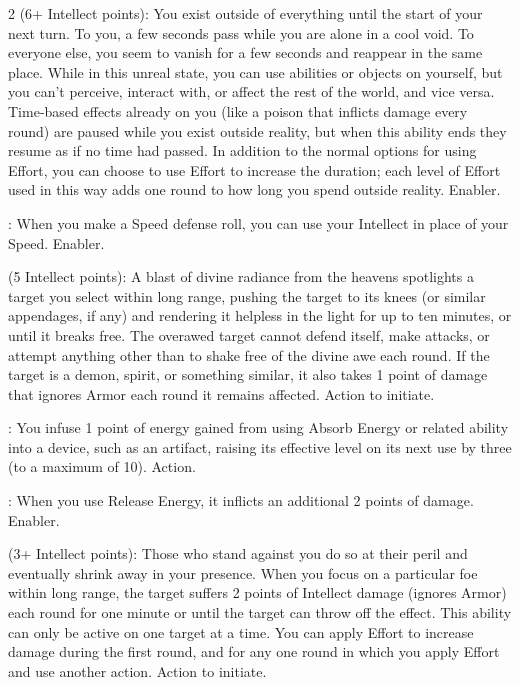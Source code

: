 \begin{multicols}{2}
 (6+ Intellect points): You exist outside of everything until the start of your next turn. To you, a few seconds pass while you are alone in a cool void. To everyone else, you seem to vanish for a few seconds and reappear in the same place. While in this unreal state, you can use abilities or objects on yourself, but you can’t perceive, interact with, or affect the rest of the world, and vice versa. Time-based effects already on you (like a poison that inflicts damage every round) are paused while you exist outside reality, but when this ability ends they resume as if no time had passed. In addition to the normal options for using Effort, you can choose to use Effort to increase the duration; each level of Effort used in this way adds one round to how long you spend outside reality. Enabler. 
 
: When you make a Speed defense roll, you can use your Intellect in place of your Speed. Enabler. 
 
 (5 Intellect points): A blast of divine radiance from the heavens spotlights a target you select within long range, pushing the target to its knees (or similar appendages, if any) and rendering it helpless in the light for up to ten minutes, or until it breaks free. The overawed target cannot defend itself, make attacks, or attempt anything other than to shake free of the divine awe each round. If the target is a demon, spirit, or something similar, it also takes 1 point of damage that ignores Armor each round it remains affected. Action to initiate. 
 
: You infuse 1 point of energy gained from using Absorb Energy or related ability into a device, such as an artifact, raising its effective level on its next use by three (to a maximum of 10). Action.
 
: When you use Release Energy, it inflicts an additional 2 points of damage. Enabler. 
 
 (3+ Intellect points): Those who stand against you do so at their peril and eventually shrink away in your presence. When you focus on a particular foe within long range, the target suffers 2 points of Intellect damage (ignores Armor) each round for one minute or until the target can throw off the effect. This ability can only be active on one target at a time. You can apply Effort to increase damage during the first round, and for any one round in which you apply Effort and use another action. Action to initiate. 
 

\end{multicols}
